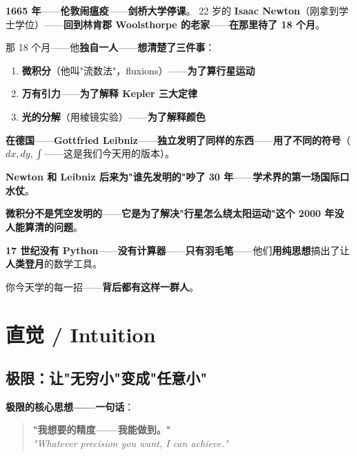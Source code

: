 \begin{tcolorbox}[storybox={\Large 小故事：Newton 与瘟疫之年}]
\textbf{1665 年}——\textbf{伦敦闹瘟疫}——\textbf{剑桥大学停课}。
22 岁的 \textbf{Isaac Newton}（刚拿到学士学位）——\textbf{回到林肯郡 Woolsthorpe 的老家}——\textbf{在那里待了 18 个月}。

\medskip

那 18 个月——他\textbf{独自一人}——\textbf{想清楚了三件事}：

\begin{enumerate}
\item \textbf{微积分}（他叫"流数法"，fluxions）——\textbf{为了算行星运动}
\item \textbf{万有引力}——\textbf{为了解释 Kepler 三大定律}
\item \textbf{光的分解}（用棱镜实验）——\textbf{为了解释颜色}
\end{enumerate}

\medskip

\textbf{在德国}——\textbf{Gottfried Leibniz}——\textbf{独立发明了同样的东西}——\textbf{用了不同的符号}（$dx, dy, \int$——这是我们今天用的版本）。

\textbf{Newton 和 Leibniz 后来为"谁先发明的"吵了 30 年}——\textbf{学术界的第一场国际口水仗}。

\medskip

\textbf{微积分不是凭空发明的}——\textbf{它是为了解决"行星怎么绕太阳运动"这个 2000 年没人能算清的问题}。

\textbf{17 世纪没有 Python}——\textbf{没有计算器}——\textbf{只有羽毛笔}——他们\textbf{用纯思想}搞出了让\textbf{人类登月}的数学工具。

\medskip

你今天学的每一招——\textbf{背后都有这样一群人}。
\end{tcolorbox}

\section{直觉 / Intuition}

\subsection{极限：让"无穷小"变成"任意小"}

\textbf{极限的核心思想——一句话}：

\begin{quote}
\textbf{"我想要的精度——我能做到。"}\\[4pt]
\itshape "Whatever precision you want, I can achieve."
\end{quote}

